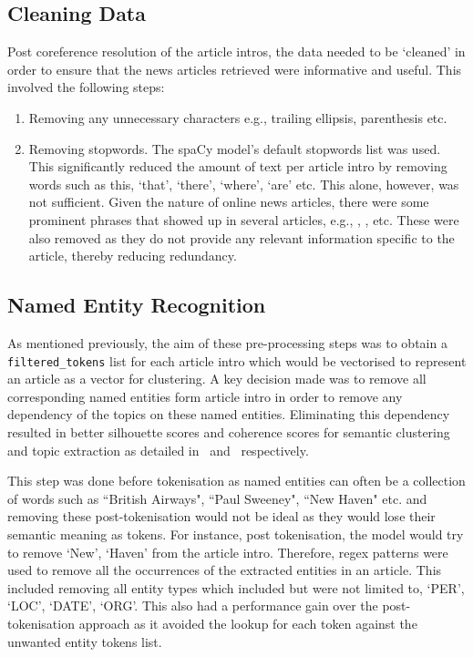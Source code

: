 \subsection{Cleaning Data} \label{data_cleaning}
Post coreference resolution of the article intros, the data needed to be `cleaned' in order to ensure that the news articles retrieved were informative and useful. This involved the following steps: 
\begin{enumerate}
    \item Removing any unnecessary characters e.g., trailing ellipsis, parenthesis etc.
    \item Removing stopwords. The spaCy model's default stopwords list was used. This significantly reduced the amount of text per article intro by removing words such as this, `that', `there', `where', `are' etc. This alone, however, was not sufficient. Given the nature of online news articles, there were some prominent phrases that showed up in several articles, e.g., , ,  etc. These were also removed as they do not provide any relevant information specific to the article, thereby reducing redundancy.

\end{enumerate}

\subsection{Named Entity Recognition}
As mentioned previously, the aim of these pre-processing steps was to obtain a \texttt{filtered\_tokens} list for each article intro which would be vectorised to represent an article as a vector for clustering. A key decision made was to remove all corresponding named entities form article intro in order to remove any dependency of the topics on these named entities. Eliminating this dependency resulted in better silhouette scores and coherence scores for semantic clustering and topic extraction as detailed in~ and~ respectively. 

This step was done before tokenisation as named entities can often be a collection of words such as ``British Airways", ``Paul Sweeney", ``New Haven" etc. and removing these post-tokenisation would not be ideal as they would lose their semantic meaning as tokens. For instance, post tokenisation, the model would try to remove `New', `Haven' from the article intro. Therefore, regex patterns were used to remove all the occurrences of the extracted entities in an article. This included removing all entity types which included but were not limited to, `PER', `LOC', `DATE', `ORG'. This also had a performance gain over the post-tokenisation approach as it avoided the lookup for each token against the unwanted entity tokens list.

